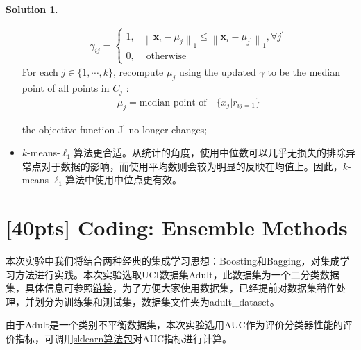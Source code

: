 \documentclass[a4paper,UTF8]{article}
\theoremstyle{definition}
\newtheorem*{solution}{Solution}
\begin{document}
\begin{solution}
\begin{itemize}
{\begin{algorithm}[h]
\begin{algorithmic}[1]
{				\begin{align}\gamma_{i j}=\left\{\begin{array}{ll}
				1, & \left\|\mathbf{x}_{i}-\mu_{j}\right\|_1 \leq\left\|\mathbf{x}_{i}-\mu_{j^{\prime}}\right\|_1, \forall j^{\prime} \\
				0, & \text { otherwise }
				\end{array}\right.\end{align}
				 For each $j \in\{1, \cdots, k\}$, recompute $\mu_j$ using the updated 
$\gamma$ to be the median point of all points in $C_j$ :
			\begin{align}\mu_{j}=\text{median point of} \quad\{ x_{j}| r_{ij=1}\}
			\end{align}	
		
				\UNTIL the objective function $\text{J}^\prime$ no longer changes;}
		\end{algorithmic}
		
\end{algorithm}}

	\item $k$-means-$\ell_1$算法更合适。从统计的角度，使用中位数可以几乎无损失的排除异常点对于数据的影响，而使用平均数则会较为明显的反映在均值上。因此，$k$-means-$\ell _1$算法中使用中位点更有效。
\end{itemize}
\end{solution}


\section{[40pts] Coding: Ensemble Methods }

本次实验中我们将结合两种经典的集成学习思想：Boosting和Bagging，对集成学习方法进行实践。本次实验选取UCI数据集Adult，此数据集为一个二分类数据集，具体信息可参照\href{http://archive.ics.uci.edu/ml/datasets/Adult}{链接}，为了方便大家使用数据集，已经提前对数据集稍作处理，并划分为训练集和测试集，数据集文件夹为adult\_dataset。

由于Adult是一个类别不平衡数据集，本次实验选用AUC作为评价分类器性能的评价指标，可调用\href{http://scikit-learn.org/stable/modules/generated/sklearn.metrics.roc_auc_score.html}{sklearn算法包}对AUC指标进行计算。
\end{document}
